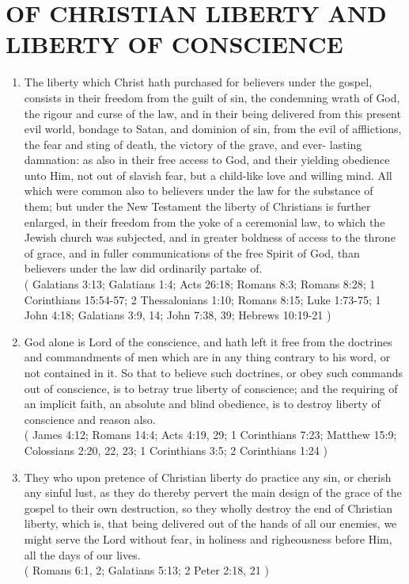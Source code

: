 \documentclass[12pt,a4paper]{book}
\begin{document}
\chapter{OF CHRISTIAN LIBERTY AND LIBERTY OF CONSCIENCE}
\label{ch-lib-con}
\begin{enumerate}
\item
\label{ch-lib-con-1}
The liberty which Christ hath purchased for believers under the gospel, consists in their freedom from the guilt of sin, the condemning wrath of God, the rigour and curse of the law, and in their being delivered from this present evil world, bondage to Satan, and dominion of sin, from the evil of afflictions, the fear and sting of death, the victory of the grave, and ever- lasting damnation: as also in their free access to God, and their yielding obedience unto Him, not out of slavish fear, but a child-like love and willing mind.
All which were common also to believers under the law for the substance of them; but under the New Testament the liberty of Christians is further enlarged, in their freedom from the yoke of a ceremonial law, to which the Jewish church was subjected, and in greater boldness of access to the throne of grace, and in fuller communications of the free Spirit of God, than believers under the law did ordinarily partake of.\\
( Galatians 3:13; Galatians 1:4; Acts 26:18; Romans 8:3; Romans 8:28; 1 Corinthians 15:54-57; 2 Thessalonians 1:10; Romans 8:15; Luke 1:73-75; 1 John 4:18; Galatians 3:9, 14; John 7:38, 39; Hebrews 10:19-21 )
\item
\label{ch-lib-con-2}
God alone is Lord of the conscience, and hath left it free from the doctrines and commandments of men which are in any thing contrary to his word, or not contained in it. So that to believe such doctrines, or obey such commands out of conscience, is to betray true liberty of conscience; and the requiring of an implicit faith, an absolute and blind obedience, is to destroy liberty of conscience and reason also.\\
( James 4:12; Romans 14:4; Acts 4:19, 29; 1 Corinthians 7:23; Matthew 15:9; Colossians 2:20, 22, 23; 1 Corinthians 3:5; 2 Corinthians 1:24 )
\item
\label{ch-lib-con-3}
They who upon pretence of Christian liberty do practice any sin, or cherish any sinful lust, as they do thereby pervert the main design of the grace of the gospel to their own destruction, so they wholly destroy the end of Christian liberty, which is, that being delivered out of the hands of all our enemies, we might serve the Lord without fear, in holiness and righeousness before Him, all the days of our lives.\\
( Romans 6:1, 2; Galatians 5:13; 2 Peter 2:18, 21 )
\end{enumerate}
\end{document}
